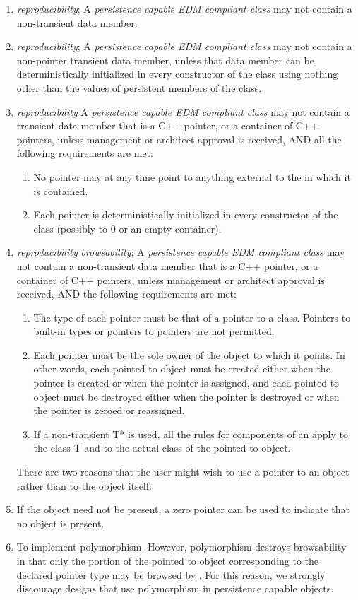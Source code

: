 \documentclass[draftmode]{memarticle}
\newcommand{\Root}{\productname{Root}}
\newcommand{\EDProduct}{\classname{ED\-Product}}
\begin{document}
\begin{enumerate}
	\item \emph{reproducibility}; A \emph{persistence capable EDM compliant class} may not contain a non-transient  data member.

	\item \emph{reproducibility}; A \emph{persistence capable EDM compliant class} may not contain a non-pointer transient data member, unless that data member can be deterministically initialized in every constructor of the class using nothing other than the values of persistent members of the class.

	\item \emph{reproducibility} A \emph{persistence capable EDM compliant class} may not contain a transient data member that is a C++ pointer, or a container of C++ pointers, unless management or architect approval is received, AND all the following requirements are met:
	\begin{enumerate}
		\item No pointer may at any time point to anything external to the \EDProduct in which it is contained.

		\item Each pointer is deterministically initialized in every constructor of the class (possibly to 0 or an empty container).
	\end{enumerate}

	\item \emph{reproducibility} \emph{browsability}; A \emph{persistence capable EDM compliant class} may not contain a non-transient data member that is a C++ pointer, or a container of C++ pointers, unless management or architect approval is received, AND the following requirements are met:
	\begin{enumerate}
		\item The type of each pointer must be that of a pointer to a class.  Pointers to built-in types or pointers to pointers are not permitted.
		\item Each pointer must be the sole owner of the object to which it points.  In other words, each pointed to object must be created either when the pointer is created or when the pointer is assigned, and each pointed to object must be destroyed either when the pointer is destroyed or when the pointer is zeroed or reassigned.
		\item If a non-transient T* is used, all the rules for components of an \EDProduct apply to the class T and to the actual class of the pointed to object.
	\end{enumerate}
There are two reasons that the user might wish to use a pointer to an object rather than to the object itself:
                \item If the object need not be present, a zero pointer can be used to indicate that no object is present.
		\item To implement polymorphism. However, polymorphism destroys browsability in that only the portion of the pointed to object corresponding to the declared pointer type may be browsed by \Root. For this reason, we strongly discourage designs that use polymorphism in persistence capable objects.


\end{enumerate}
\end{document}
